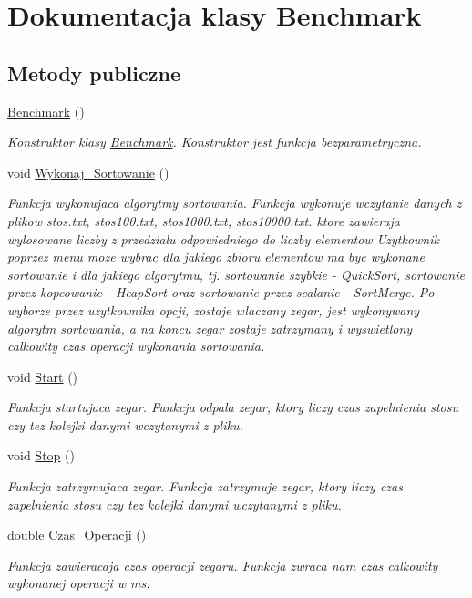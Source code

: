 \hypertarget{class_benchmark}{\section{\-Dokumentacja klasy \-Benchmark}
\label{class_benchmark}
}
\subsection*{\-Metody publiczne}
\begin{DoxyCompactItemize}
\item 
\hyperlink{class_benchmark_acfca497989836a688d44477802e822d8}{\-Benchmark} ()
\begin{DoxyCompactList}\small\item\em \-Konstruktor klasy \hyperlink{class_benchmark}{\-Benchmark}. \-Konstruktor jest funkcja bezparametryczna. \end{DoxyCompactList}\item 
void \hyperlink{class_benchmark_a4b7c72902d81ff3829f990b3b112b5e1}{\-Wykonaj\-\_\-\-Sortowanie} ()
\begin{DoxyCompactList}\small\item\em \-Funkcja wykonujaca algorytmy sortowania. \-Funkcja wykonuje wczytanie danych z plikow stos.\-txt, stos100.\-txt, stos1000.\-txt, stos10000.\-txt. ktore zawieraja wylosowane liczby z przedzialu odpowiedniego do liczby elementow \-Uzytkownik poprzez menu moze wybrac dla jakiego zbioru elementow ma byc wykonane sortowanie i dla jakiego algorytmu, tj. sortowanie szybkie -\/ \-Quick\-Sort, sortowanie przez kopcowanie -\/ \-Heap\-Sort oraz sortowanie przez scalanie -\/ \-Sort\-Merge. \-Po wyborze przez uzytkownika opcji, zostaje wlaczany zegar, jest wykonywany algorytm sortowania, a na koncu zegar zostaje zatrzymany i wyswietlony calkowity czas operacji wykonania sortowania. \end{DoxyCompactList}\item 
void \hyperlink{class_benchmark_ac55ca7809108ed22a644d6d41071d187}{\-Start} ()
\begin{DoxyCompactList}\small\item\em \-Funkcja startujaca zegar. \-Funkcja odpala zegar, ktory liczy czas zapelnienia stosu czy tez kolejki danymi wczytanymi z pliku. \end{DoxyCompactList}\item 
void \hyperlink{class_benchmark_aa3ca94f8984beb0ecbfa77d50cbe5c3a}{\-Stop} ()
\begin{DoxyCompactList}\small\item\em \-Funkcja zatrzymujaca zegar. \-Funkcja zatrzymuje zegar, ktory liczy czas zapelnienia stosu czy tez kolejki danymi wczytanymi z pliku. \end{DoxyCompactList}\item 
double \hyperlink{class_benchmark_aee4890492aa777816da1d63fa7a8c4c2}{\-Czas\-\_\-\-Operacji} ()
\begin{DoxyCompactList}\small\item\em \-Funkcja zawieracaja czas operacji zegaru. \-Funkcja zwraca nam czas calkowity wykonanej operacji w ms. \end{DoxyCompactList}\end{DoxyCompactItemize}
